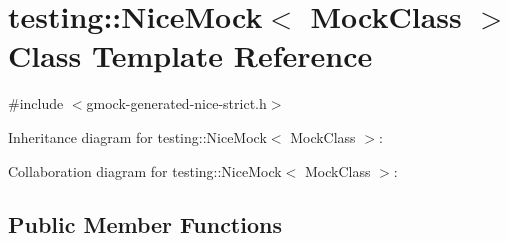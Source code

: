 \hypertarget{classtesting_1_1_nice_mock}{}\section{testing\+:\+:Nice\+Mock$<$ Mock\+Class $>$ Class Template Reference}
\label{classtesting_1_1_nice_mock}


{\ttfamily \#include $<$gmock-\/generated-\/nice-\/strict.\+h$>$}



Inheritance diagram for testing\+:\+:Nice\+Mock$<$ Mock\+Class $>$\+:


Collaboration diagram for testing\+:\+:Nice\+Mock$<$ Mock\+Class $>$\+:
\subsection*{Public Member Functions}
